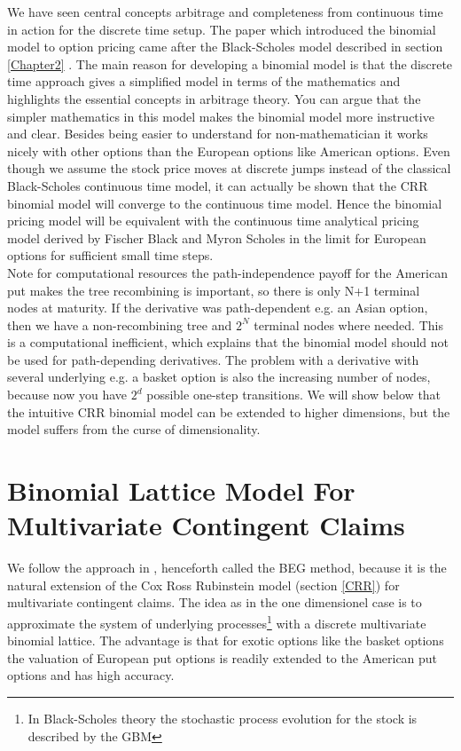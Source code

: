 We have seen central concepts arbitrage and completeness from continuous time in action for the discrete time setup. The paper \parencite{CRR} which introduced the binomial model to option pricing came after the Black-Scholes model described in section \ref{Chapter2} \parencite{B-S-Paper}. The main reason for developing a binomial model is that the discrete time approach gives a simplified model in terms of the mathematics and highlights the essential concepts in arbitrage theory. You can argue that the simpler mathematics in this model makes the binomial model more instructive and clear. Besides being easier to understand for non-mathematician it works nicely with other options than the European options like American options. Even though we assume the stock price moves at discrete jumps instead of the classical Black-Scholes continuous time model, it can actually be shown that the CRR binomial model will converge to the continuous time model. Hence the binomial pricing model will be equivalent with the continuous time analytical pricing model derived by Fischer Black and Myron Scholes in the limit for European options for sufficient small time steps. \\

Note for computational resources the path-independence payoff for the American put makes the tree recombining is important, so there is only N+1 terminal nodes at maturity. If the derivative was path-dependent e.g. an Asian option, then we have a non-recombining tree and $2^{N}$ terminal nodes where needed. This is a computational inefficient, which explains that the binomial model should not be used for path-depending derivatives. The problem with a derivative with several underlying e.g. a basket option is also the increasing number of nodes, because now you have $2^d$ possible one-step transitions. We will show below that the intuitive CRR binomial model can be extended to higher dimensions, but the model suffers from the curse of dimensionality.

\newpage
\section{Binomial Lattice Model For Multivariate Contingent Claims}
We follow the approach in \parencite{BEG}, henceforth called the BEG method, because it is the natural extension of the Cox Ross Rubinstein model (section \ref{CRR}) for multivariate contingent claims. The idea as in the one dimensionel case is to approximate the system of underlying processes\footnote{In Black-Scholes theory the stochastic process evolution for the stock is described by the GBM} with a discrete multivariate binomial lattice. The advantage is that for exotic options like the basket options the valuation of European put options is readily extended to the American put options and has high accuracy. \\

